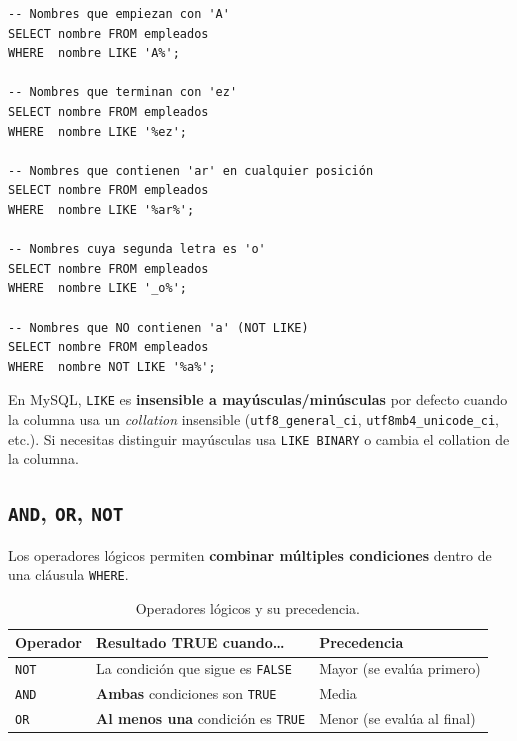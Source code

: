 \begin{lstlisting}[caption={Patrones con LIKE.}]
-- Nombres que empiezan con 'A'
SELECT nombre FROM empleados
WHERE  nombre LIKE 'A%';

-- Nombres que terminan con 'ez'
SELECT nombre FROM empleados
WHERE  nombre LIKE '%ez';

-- Nombres que contienen 'ar' en cualquier posición
SELECT nombre FROM empleados
WHERE  nombre LIKE '%ar%';

-- Nombres cuya segunda letra es 'o'
SELECT nombre FROM empleados
WHERE  nombre LIKE '_o%';

-- Nombres que NO contienen 'a' (NOT LIKE)
SELECT nombre FROM empleados
WHERE  nombre NOT LIKE '%a%';
\end{lstlisting}

\begin{nota}
En MySQL, \texttt{LIKE} es \textbf{insensible a mayúsculas/minúsculas}
por defecto cuando la columna usa un \textit{collation} insensible
(\texttt{utf8\_general\_ci}, \texttt{utf8mb4\_unicode\_ci}, etc.).
Si necesitas distinguir mayúsculas usa \texttt{LIKE BINARY} o cambia
el collation de la columna.
\end{nota}

\subsection{\texttt{AND}, \texttt{OR}, \texttt{NOT}}

Los operadores lógicos permiten \textbf{combinar múltiples
condiciones} dentro de una cláusula \texttt{WHERE}.

\begin{table}[H]
\centering
\small
\renewcommand{\arraystretch}{1.5}
\begin{tabularx}{\linewidth}{@{} l X X @{}}
\toprule
\textbf{Operador} & \textbf{Resultado TRUE cuando\ldots} & \textbf{Precedencia} \\
\midrule
\texttt{NOT} & La condición que sigue es \texttt{FALSE}
             & Mayor (se evalúa primero) \\
\texttt{AND} & \textbf{Ambas} condiciones son \texttt{TRUE}
             & Media \\
\texttt{OR}  & \textbf{Al menos una} condición es \texttt{TRUE}
             & Menor (se evalúa al final) \\
\bottomrule
\end{tabularx}
\caption{Operadores lógicos y su precedencia.}
\label{tab:operadores-logicos}
\end{table}

